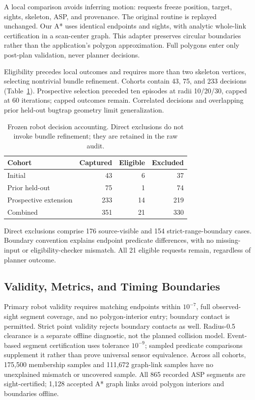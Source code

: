 A local comparison avoids inferring motion: requests freeze position, target, sights, skeleton, ASP, and provenance. The original routine is replayed unchanged. Our A* uses identical endpoints and sights, with analytic whole-link certification in a scan-center graph. This adapter preserves circular boundaries rather than the application's polygon approximation. Full polygons enter only post-plan validation, never planner decisions.

Eligibility precedes local outcomes and requires more than two skeleton vertices, selecting nontrivial bundle refinement. Cohorts contain 43, 75, and 233 decisions (Table~\ref{tab:eligibility}). Prospective selection preceded ten episodes at radii 10/20/30, capped at 60 iterations; capped outcomes remain. Correlated decisions and overlapping prior held-out bugtrap geometry limit generalization.

\begin{table}[htbp]
\caption{Frozen robot decision accounting. Direct exclusions do not invoke bundle refinement; they are retained in the raw audit.}\label{tab:eligibility}
\centering\begin{tabular}{lrrr}\toprule
Cohort & Captured & Eligible & Excluded\\\midrule
Initial &43&6&37\\
Prior held-out &75&1&74\\
Prospective extension &233&14&219\\\midrule
Combined &351&21&330\\\bottomrule
\end{tabular}
\end{table}

\begin{samepage}
Direct exclusions comprise 176 source-visible and 154 strict-range-boundary cases. Boundary convention explains endpoint predicate differences, with no missing-input or eligibility-checker mismatch. All 21 eligible requests remain, regardless of planner outcome.
\par\end{samepage}

\subsection{Validity, Metrics, and Timing Boundaries}
Primary robot validity requires matching endpoints within $10^{-7}$, full observed-sight segment coverage, and no polygon-interior entry; boundary contact is permitted. Strict point validity rejects boundary contacts as well. Radius-0.5 clearance is a separate offline diagnostic, not the planned collision model. Event-based segment certification uses tolerance $10^{-9}$; sampled predicate comparisons supplement it rather than prove universal sensor equivalence. Across all cohorts, 175,500 membership samples and 111,672 graph-link samples have no unexplained mismatch or uncovered sample. All 865 recorded ASP segments are sight-certified; 1,128 accepted A* graph links avoid polygon interiors and boundaries offline.

